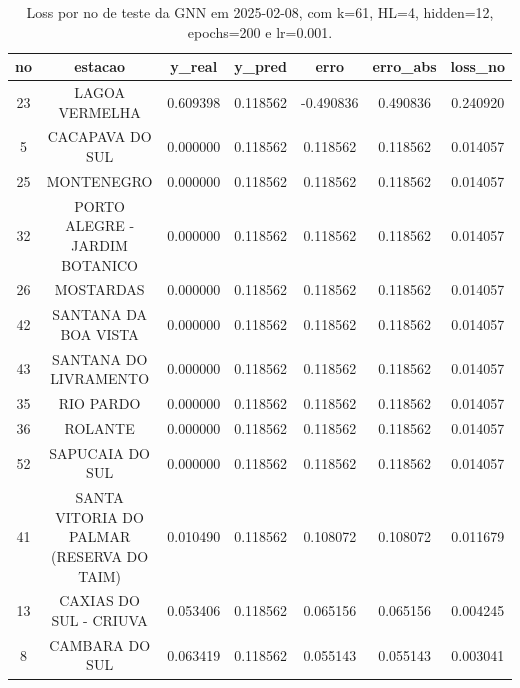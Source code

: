 \begin{table}[h]
\centering
\caption{Loss por no de teste da GNN em 2025-02-08, com k=61, HL=4, hidden=12, epochs=200 e lr=0.001.}
\label{tab:gnn_loss_k61_hl4_h12_e200_d20250208}
\begin{tabular}{ccccccc}
\toprule
no & estacao & y\_real & y\_pred & erro & erro\_abs & loss\_no \\
\midrule
23 & LAGOA VERMELHA & 0.609398 & 0.118562 & -0.490836 & 0.490836 & 0.240920 \\
5 & CACAPAVA DO SUL & 0.000000 & 0.118562 & 0.118562 & 0.118562 & 0.014057 \\
25 & MONTENEGRO & 0.000000 & 0.118562 & 0.118562 & 0.118562 & 0.014057 \\
32 & PORTO ALEGRE - JARDIM BOTANICO & 0.000000 & 0.118562 & 0.118562 & 0.118562 & 0.014057 \\
26 & MOSTARDAS & 0.000000 & 0.118562 & 0.118562 & 0.118562 & 0.014057 \\
42 & SANTANA DA BOA VISTA & 0.000000 & 0.118562 & 0.118562 & 0.118562 & 0.014057 \\
43 & SANTANA DO LIVRAMENTO & 0.000000 & 0.118562 & 0.118562 & 0.118562 & 0.014057 \\
35 & RIO PARDO & 0.000000 & 0.118562 & 0.118562 & 0.118562 & 0.014057 \\
36 & ROLANTE & 0.000000 & 0.118562 & 0.118562 & 0.118562 & 0.014057 \\
52 & SAPUCAIA DO SUL & 0.000000 & 0.118562 & 0.118562 & 0.118562 & 0.014057 \\
41 & SANTA VITORIA DO PALMAR (RESERVA DO TAIM) & 0.010490 & 0.118562 & 0.108072 & 0.108072 & 0.011679 \\
13 & CAXIAS DO SUL - CRIUVA & 0.053406 & 0.118562 & 0.065156 & 0.065156 & 0.004245 \\
8 & CAMBARA DO SUL & 0.063419 & 0.118562 & 0.055143 & 0.055143 & 0.003041 \\
\bottomrule
\end{tabular}
\end{table}

